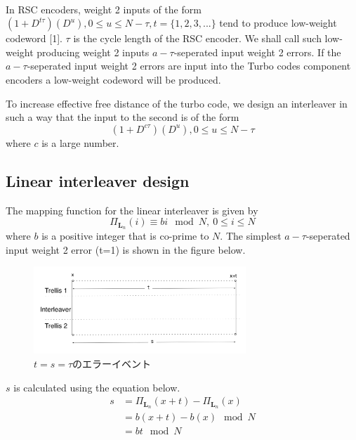 \documentclass[20 pts]{article}
\begin{document}
\paragraph{}
In RSC encoders, weight 2 inputs of the form 
$(1+D^{t\tau})(D^u) ,0\leq u\leq N-\tau, t=\{1,2,3,...\}$
 tend
 to produce low-weight codeword [1]. $\tau$ is the cycle length of the RSC encoder. 
 We shall call such low-weight producing weight 2 inputs $a-\tau$-seperated input 
 weight 2 errors. If the $a-\tau$-seperated input weight 2 errors are input into the 
 Turbo codes component encoders a low-weight codeword will be produced. 

To increase effective free distance of the turbo code, we design an interleaver in such 
a way that the input to the second is of the form 
\begin{equation}
(1+D^{c\tau})(D^u) ,0\leq u\leq N-\tau
\label{one}
\end{equation}
where $c$ is a large number.

\subsection{Linear interleaver design}
The mapping function for the linear interleaver is given by
\begin{equation}
\Pi_{\mathbf{L}_n}(i) \equiv bi  \mod N, \ 0 \leq i \leq N
\label{two}
\end{equation}
where $b$ is a positive integer that is co-prime to $N$. 
The simplest $a-\tau$-seperated input weight 2 error (t=1) is shown in the figure 
below.

\begin{center}
\begin{figure}[h!]
\includegraphics[width=8cm]{weight2.jpg}
\caption{$t=s=\tau$のエラーイベント}
\label{2_error}
\end{figure}
\end{center}

$s$ is calculated using the equation below.
\begin{equation}
\begin{split}
s&=\Pi_{\mathbf{L}_n}(x+t)-\Pi_{\mathbf{L}_n}(x)\\
&=b(x+t)-b(x) \mod N\\
&=bt \mod N
\label{three}
\end{split}
\end{equation}
\end{document}

